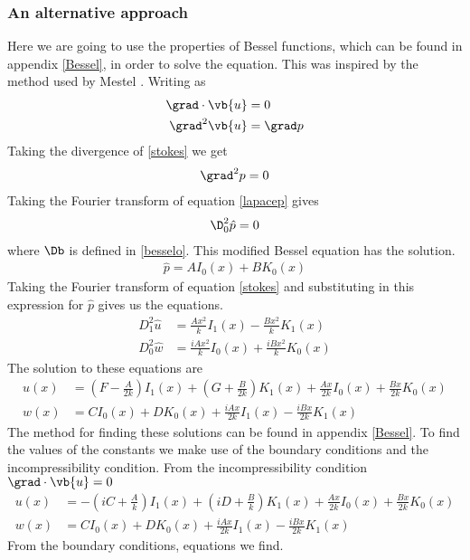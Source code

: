 \documentclass[12pt]{article}
\begin{document}
\subsubsection{An alternative approach}
Here we are going to use the properties of Bessel functions, which can be found in appendix \ref{Bessel}, in order to solve the equation. This was inspired by the method used by Mestel \cite{mestel_1996}.
Writing  as
\begin{align}
\grad \cdot\vb{u}&=0\\
\grad^2\vb{u}&=\grad p \label{stokes}
\end{align}
Taking the divergence of \eqref{stokes} we get
\begin{align}
\grad^2p=0 \label{lapacep}
\end{align}
Taking the Fourier transform of equation \ref{lapacep} gives
\begin{align}
\D^2_0 \hat{p}=0
\end{align}
where $\Db$ is defined in \eqref{besselo}. This modified Bessel equation has the solution.
\begin{align}
\hat{p}=AI_0(x)+BK_0(x)
\end{align}
Taking the Fourier transform of equation \eqref{stokes} and substituting in this expression for $\hat p$ gives us the equations.
\begin{align}
D^2_1\hat{u}&=\frac{Ax^2}{k}I_1(x)-\frac{Bx^2}{k}K_1(x)\\
D^2_0\hat{w}&=\frac{iAx^2}{k}I_0(x)+\frac{iBx^2}{k}K_0(x)
\end{align}
The solution to these equations are
\begin{align}
u(x)&=\left(F-\frac{A}{2k}\right)I_1(x)+\left(G+\frac{B}{2k}\right)K_1(x)+\frac{Ax}{2k}I_0(x)+\frac{Bx}{2k}K_0(x)\\
w(x)&=CI_0(x)+DK_0(x)+\frac{iAx}{2k}I_1(x)-\frac{iBx}{2k}K_1(x)
\end{align}
The method for finding these solutions can be found in appendix \ref{Bessel}. To find the values of the constants we make use of the boundary conditions and the incompressibility condition. From the incompressibility condition $\grad\cdot\vb{u}=0$
\begin{align}
u(x)&=-\left(iC+\frac{A}{k}\right)I_1(x)+\left(iD+\frac{B}{k}\right)K_1(x)+\frac{Ax}{2k}I_0(x)+\frac{Bx}{2k}K_0(x)\\
w(x)&=CI_0(x)+DK_0(x)+\frac{iAx}{2k}I_1(x)-\frac{iBx}{2k}K_1(x)
\end{align}
From the boundary conditions, equations  we find.
\end{document}

